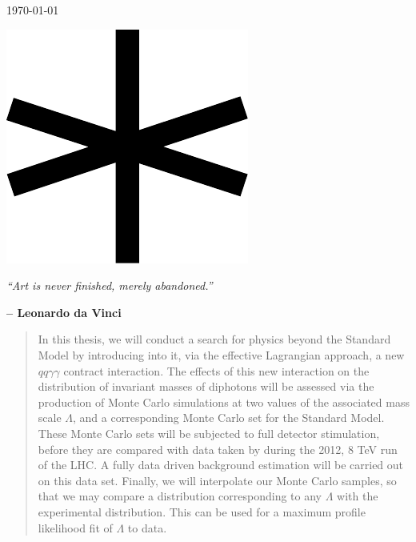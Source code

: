 \begin{titlingpage}
{{\begin{hangparas}{0em}{0}
\today
\end{hangparas}
}
\clearpage}
\thispagestyle{empty}
  \phantom{p}
\vspace{1.16\textwidth}

\begin{center}
\includegraphics[width=.1\textwidth]{star1}

\vspace{2em}
\begin{minipage}{.6\textwidth}
\emph{``Art is never finished, merely abandoned.''}

\raggedleft\small\sffamily\bfseries\vspace{1em} -- Leonardo da Vinci
\end{minipage}
\end{center}
\clearpage
\end{titlingpage}
\frontmatter

\begin{abstract}
In this thesis, we will conduct a search for physics beyond the Standard Model by introducing into it, via the effective Lagrangian approach, a new $qq\gamma\gamma$ contract interaction. The effects of this new interaction on the distribution of invariant masses of diphotons will be assessed via the production of Monte Carlo simulations at two values of the associated mass scale $\Lambda$, and a corresponding Monte Carlo set for the Standard Model. These Monte Carlo sets will be subjected to full \atlas{} detector stimulation, before they are compared with data taken by \atlas{} during the 2012, 8 TeV run of the LHC. A fully data driven background estimation will be carried out on this data set. Finally, we will interpolate our Monte Carlo samples, so that we may compare a distribution corresponding to any $\Lambda$ with the experimental distribution. This can be used for a maximum profile likelihood fit of $\Lambda$ to data.
\end{abstract}

